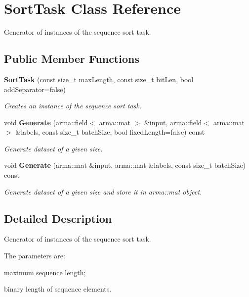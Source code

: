 \section{Sort\+Task Class Reference}
\label{classmlpack_1_1ann_1_1augmented_1_1tasks_1_1SortTask}


Generator of instances of the sequence sort task.  


\subsection*{Public Member Functions}
\begin{DoxyCompactItemize}
\item 
\textbf{ Sort\+Task} (const size\+\_\+t max\+Length, const size\+\_\+t bit\+Len, bool add\+Separator=false)
\begin{DoxyCompactList}\small\item\em Creates an instance of the sequence sort task. \end{DoxyCompactList}\item 
void \textbf{ Generate} (arma\+::field$<$ arma\+::mat $>$ \&input, arma\+::field$<$ arma\+::mat $>$ \&labels, const size\+\_\+t batch\+Size, bool fixed\+Length=false) const
\begin{DoxyCompactList}\small\item\em Generate dataset of a given size. \end{DoxyCompactList}\item 
void \textbf{ Generate} (arma\+::mat \&input, arma\+::mat \&labels, const size\+\_\+t batch\+Size) const
\begin{DoxyCompactList}\small\item\em Generate dataset of a given size and store it in arma\+::mat object. \end{DoxyCompactList}\end{DoxyCompactItemize}


\subsection{Detailed Description}
Generator of instances of the sequence sort task. 

The parameters are\+:
\begin{DoxyItemize}
\item maximum sequence length;
\item binary length of sequence elements.
\end{DoxyItemize}

